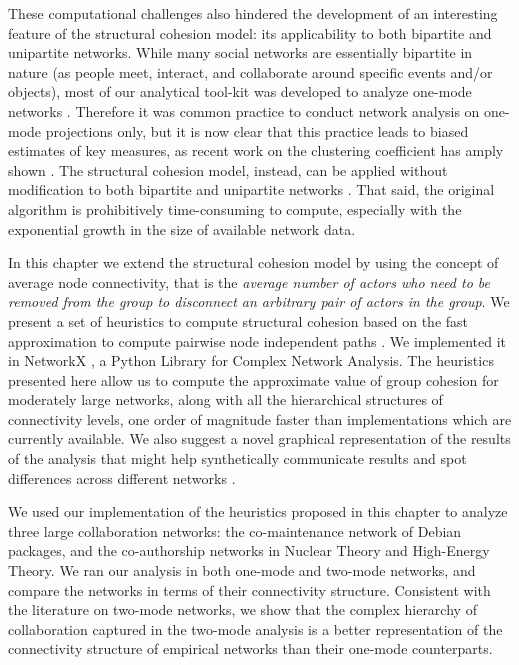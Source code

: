 These computational challenges also hindered the development of an interesting feature of the structural cohesion model: its applicability to both bipartite and unipartite networks. While many social networks are essentially bipartite in nature (as people meet, interact, and collaborate around specific events and/or objects), most of our analytical tool-kit was developed to analyze one-mode networks \citep*{latapy:2008}. Therefore it was common practice to conduct network analysis on one-mode projections only, but it is now clear that this practice leads to biased estimates of key measures, as recent work on the clustering coefficient has amply shown \citep{robins:2004,lind:2005,latapy:2008}. The structural cohesion model, instead, can be applied without modification to both bipartite and unipartite networks \citep*{white:2004}. That said, the original algorithm is prohibitively time-consuming to compute, especially with the exponential growth in the size of available network data. 

In this chapter we extend the structural cohesion model by using the concept of average node connectivity, that is the \emph{average number of actors who need to be removed from the group to disconnect an arbitrary pair of actors in  the group}. We present a set of heuristics to compute structural cohesion based on the fast approximation to compute pairwise node independent paths \citep{white:2001b}. We implemented it in NetworkX \citep{hagberg:2008}, a Python Library for Complex Network Analysis. The heuristics presented here allow us to compute the approximate value of group cohesion for moderately large networks, along with all the hierarchical structures of connectivity levels, one order of magnitude faster than implementations which are currently available. We also suggest a novel graphical representation of the results of the analysis that might help synthetically communicate results and spot differences across different networks \citep*{moody:2005}.

We used our implementation of the heuristics proposed in this chapter to analyze three large collaboration networks: the co-maintenance network of Debian packages, and the co-authorship networks in Nuclear Theory and High-Energy Theory. We ran our analysis in both one-mode and two-mode networks, and compare the networks in terms of their connectivity structure. Consistent with the literature on two-mode networks, we show that the complex hierarchy of collaboration captured in the two-mode analysis is a better representation of the connectivity structure of empirical networks than their one-mode counterparts.


